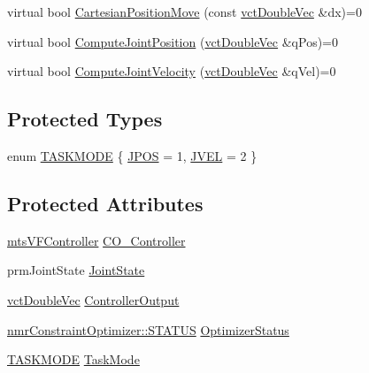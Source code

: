 \begin{DoxyCompactItemize}
\item 
virtual bool \hyperlink{classmts_robot_task_a59dbc2c04bc10854230496843579010c}{Cartesian\-Position\-Move} (const \hyperlink{vct_dynamic_vector_types_8h_ade4b3068c86fb88f41af2e5187e491c2}{vct\-Double\-Vec} \&dx)=0
\item 
virtual bool \hyperlink{classmts_robot_task_a575b9ff835559ca9cb4ce6471e626548}{Compute\-Joint\-Position} (\hyperlink{vct_dynamic_vector_types_8h_ade4b3068c86fb88f41af2e5187e491c2}{vct\-Double\-Vec} \&q\-Pos)=0
\item 
virtual bool \hyperlink{classmts_robot_task_adbe66f085103b70f2aad4585753e72d1}{Compute\-Joint\-Velocity} (\hyperlink{vct_dynamic_vector_types_8h_ade4b3068c86fb88f41af2e5187e491c2}{vct\-Double\-Vec} \&q\-Vel)=0
\end{DoxyCompactItemize}
\subsection*{Protected Types}
\begin{DoxyCompactItemize}
\item 
enum \hyperlink{classmts_robot_task_a923d3233420024307a4c7cd85e011486}{T\-A\-S\-K\-M\-O\-D\-E} \{ \hyperlink{classmts_robot_task_a923d3233420024307a4c7cd85e011486a254870bb4f75421d28f48a18be4c4302}{J\-P\-O\-S} = 1, 
\hyperlink{classmts_robot_task_a923d3233420024307a4c7cd85e011486ab57992254d70c5470dd70451d7060500}{J\-V\-E\-L} = 2
 \}
\end{DoxyCompactItemize}
\subsection*{Protected Attributes}
\begin{DoxyCompactItemize}
\item 
\hyperlink{classmts_v_f_controller}{mts\-V\-F\-Controller} \hyperlink{classmts_robot_task_a1c15d44bb845e176fc619c12a32a92a0}{C\-O\-\_\-\-Controller}
\item 
prm\-Joint\-State \hyperlink{classmts_robot_task_a2c1bc0f905efde3109a0535e107013fc}{Joint\-State}
\item 
\hyperlink{vct_dynamic_vector_types_8h_ade4b3068c86fb88f41af2e5187e491c2}{vct\-Double\-Vec} \hyperlink{classmts_robot_task_aa263aa6c4baef69846e617cdca5cf91d}{Controller\-Output}
\item 
\hyperlink{classnmr_constraint_optimizer_ad46bf972892431d2c0a43a7099aec898}{nmr\-Constraint\-Optimizer\-::\-S\-T\-A\-T\-U\-S} \hyperlink{classmts_robot_task_a3066e11973ad9a8371c36b12a0df2fa0}{Optimizer\-Status}
\item 
\hyperlink{classmts_robot_task_a923d3233420024307a4c7cd85e011486}{T\-A\-S\-K\-M\-O\-D\-E} \hyperlink{classmts_robot_task_ac3cc9bd3a27954263574d01325a6439b}{Task\-Mode}
\end{DoxyCompactItemize}
